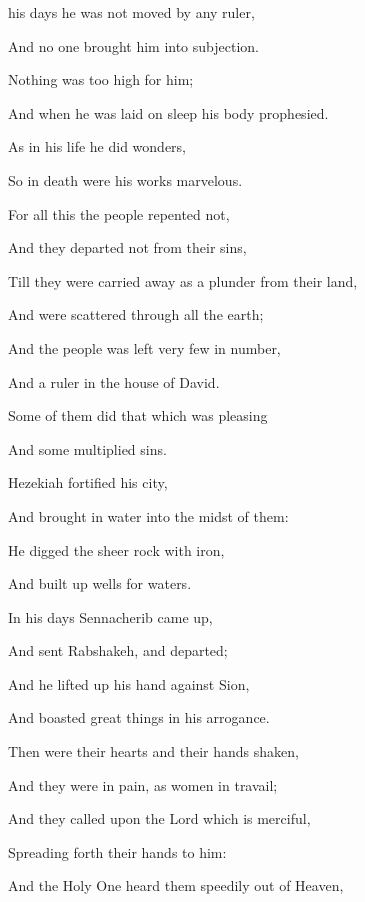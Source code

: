 {{} his days he was not moved by
{} any ruler,
\par }{\Q And no one brought him into subjection.
\par }{\Q {} Nothing was too high for him;
\par }{\Q And when he was laid on sleep his body prophesied.
\par }{\Q {}As in his life he did wonders,
\par }{\Q So in death were his works marvelous.
\par }{\Q {}For all this the people repented not,
\par }{\Q And they departed not from their sins,
\par }{\Q Till they were carried away as a plunder from their land,
\par }{\Q And were scattered through all the earth;
\par }{\Q And the people was left very few in number,
\par }{\Q And a ruler
{} in the house of David.
\par }{\Q {}Some of them did that which was pleasing
{}
\par }{\Q And some multiplied sins.
\par }{\BB \par }{\Q {}Hezekiah fortified his city,
\par }{\Q And brought in
 water into the midst of them:
\par }{\Q He digged the sheer rock with iron,
\par }{\Q And built up wells for waters.
\par }{\Q {}In his days Sennacherib came up,
\par }{\Q And sent Rabshakeh, and departed;
\par }{\Q And he lifted up his hand against Sion,
\par }{\Q And boasted great things in his arrogance.
\par }{\Q {}Then were their hearts and their hands shaken,
\par }{\Q And they were in pain, as women in travail;
\par }{\Q {}And they called upon the Lord which is merciful,
\par }{\Q Spreading forth their hands to him:
\par }{\Q And the Holy One heard them speedily out of Heaven,
}
